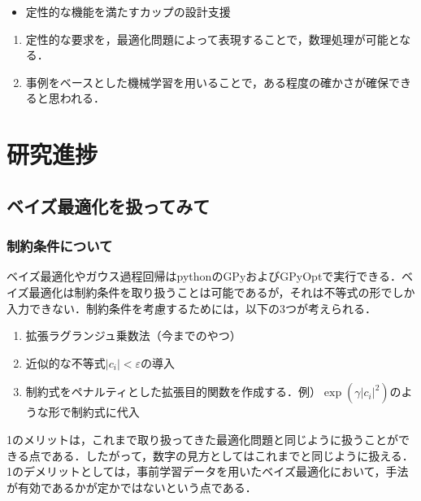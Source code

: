 \documentclass[11pt]{jsarticle}
\begin{document}
	\articleSPRabst
		\begin{itemize}
			\item 定性的な機能を満たすカップの設計支援
		\end{itemize}
		
		
	\articleSPRobj
		\begin{enumerate}
			\item 定性的な要求を，最適化問題によって表現することで，数理処理が可能となる．
			\item 事例をベースとした機械学習を用いることで，ある程度の確かさが確保できると思われる．
		\end{enumerate}
	\articleSPRitemsone
		
		\tableofcontents
		
		
	\articleSPRitemstwo
\renewcommand{\labelitemi}{$\blacktriangledown$}
	\section{研究進捗}
		\subsection{ベイズ最適化を扱ってみて}
			\subsubsection{制約条件について}
				ベイズ最適化やガウス過程回帰はpythonのGPyおよびGPyOptで実行できる．ベイズ最適化は制約条件を取り扱うことは可能であるが，それは不等式の形でしか入力できない．制約条件を考慮するためには，以下の3つが考えられる．
				\begin{enumerate}
					\item 拡張ラグランジュ乗数法（今までのやつ）
					\item 近似的な不等式$ |c_i|<\varepsilon $の導入
					\item 制約式をペナルティとした拡張目的関数を作成する．例）$ \exp(\gamma|c_i|^2) $のような形で制約式に代入
				\end{enumerate}
				1のメリットは，これまで取り扱ってきた最適化問題と同じように扱うことができる点である．したがって，数字の見方としてはこれまでと同じように扱える．1のデメリットとしては，事前学習データを用いたベイズ最適化において，手法が有効であるかが定かではないという点である．
				
\end{document}
